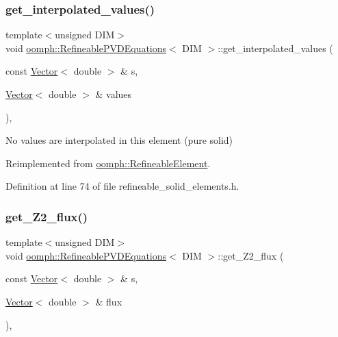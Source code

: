 \subsubsection{\texorpdfstring{get\+\_\+interpolated\+\_\+values()}{get\_interpolated\_values()}\hspace{0.1cm}{\footnotesize\ttfamily [2/2]}}
{\footnotesize\ttfamily template$<$unsigned D\+IM$>$ \\
void \hyperlink{classoomph_1_1RefineablePVDEquations}{oomph\+::\+Refineable\+P\+V\+D\+Equations}$<$ D\+IM $>$\+::get\+\_\+interpolated\+\_\+values (\begin{DoxyParamCaption}\item[{const \hyperlink{classoomph_1_1Vector}{Vector}$<$ double $>$ \&}]{s,  }\item[{\hyperlink{classoomph_1_1Vector}{Vector}$<$ double $>$ \&}]{values }\end{DoxyParamCaption})\hspace{0.3cm}{\ttfamily [inline]}, {\ttfamily [virtual]}}



No values are interpolated in this element (pure solid) 



Reimplemented from \hyperlink{classoomph_1_1RefineableElement_ad9a4f92880668a2373326d8306365c43}{oomph\+::\+Refineable\+Element}.



Definition at line 74 of file refineable\+\_\+solid\+\_\+elements.\+h.

\mbox{\label{classoomph_1_1RefineablePVDEquations_a1e51d4ea46f49c62441425bc3883a589}} 
\subsubsection{\texorpdfstring{get\+\_\+\+Z2\+\_\+flux()}{get\_Z2\_flux()}}
{\footnotesize\ttfamily template$<$unsigned D\+IM$>$ \\
void \hyperlink{classoomph_1_1RefineablePVDEquations}{oomph\+::\+Refineable\+P\+V\+D\+Equations}$<$ D\+IM $>$\+::get\+\_\+\+Z2\+\_\+flux (\begin{DoxyParamCaption}\item[{const \hyperlink{classoomph_1_1Vector}{Vector}$<$ double $>$ \&}]{s,  }\item[{\hyperlink{classoomph_1_1Vector}{Vector}$<$ double $>$ \&}]{flux }\end{DoxyParamCaption})\hspace{0.3cm}{\ttfamily [inline]}, {\ttfamily [virtual]}}



